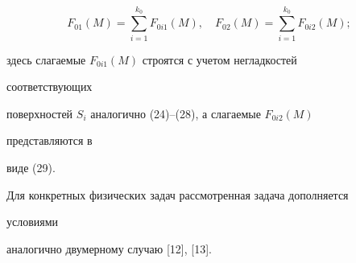\begin{pf}
$$ 


F_{01}(M)=\sum^{k_0}_{i=1}F_{0i1}(M),\quad 


F_{02}(M)=\sum^{k_0}_{i=1}F_{0i2}(M); 


$$ 


здесь слагаемые $F_{0i1}(M)$ строятся с учетом негладкостей 


соответствующих  


поверхностей $S_i$ аналогично (24)--(28), а слагаемые $F_{0i2}(M)$ 


представляются в 


виде (29). 


\end{pf} 


 


Для конкретных физических задач рассмотренная задача дополняется 


условиями 


аналогично двумерному случаю [12], [13].  


 



